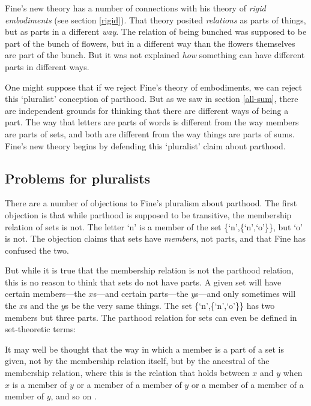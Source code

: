 \documentclass[11pt]{article}
\newenvironment{squote}{%
\begin{spacing}{1}
\begin{list}{}{%
\setlength{\labelwidth}{0pt}%
\rightmargin\leftmargin%
}
\item\relax
}{%
\end{list}%
\end{spacing}
}
\begin{document}
\begin{spacing}{1.5}
Fine's new theory has a number of connections with his theory of {\em
  rigid embodiments} (see section \ref{rigid}).  That theory posited
{\em relations} as parts of things, but as parts in a different {\em
  way}.  The relation of being bunched was supposed to be part of the
bunch of flowers, but in a different way than the flowers themselves
are part of the bunch.  But it was not explained {\em how} something
can have different parts in different ways.  

One might suppose that if we reject Fine's theory of embodiments, we
can reject this `pluralist' conception of parthood.  But as we saw in
section \ref{all-sum}, there are independent grounds for thinking that
there are different ways of being a part.  The way that letters are
parts of words is different from the way members are parts of sets,
and both are different from the way things are parts of sums.  Fine's
new theory begins by defending this `pluralist' claim about parthood.

\subsection{Problems for pluralists}
\label{sets}
There are a number of objections to Fine's pluralism about parthood.
The first objection is that while parthood is supposed to be
transitive, the membership relation of sets is not.  The letter `n' is
a member of the set \{`n',\{`n',`o'\}\}, but `o' is not.  The
objection claims that sets have {\em members}, not parts, and that
Fine has confused the two.

But while it is true that the membership relation is not the parthood
relation, this is no reason to think that sets do not have parts.  A
given set will have certain members---the $x$s---and certain
parts---the $y$s---and only sometimes will the $x$s and the $y$s be
the very same things.  The set \{`n',\{`n',`o'\}\} has two members
but three parts.  The parthood relation for sets can even be defined
in set-theoretic terms:

\begin{squote}
It may well be thought that the way in which a member is a part of a
set is given, not by the membership relation itself, but by the
ancestral of the membership relation, where this is the relation that
holds between $x$ and $y$ when $x$ is a member of $y$ or a member of a
member of $y$ or a member of a member of a member of $y$, and so on
\citep[563]{fine2010}.
\end{squote}


\end{spacing}
\end{document}
